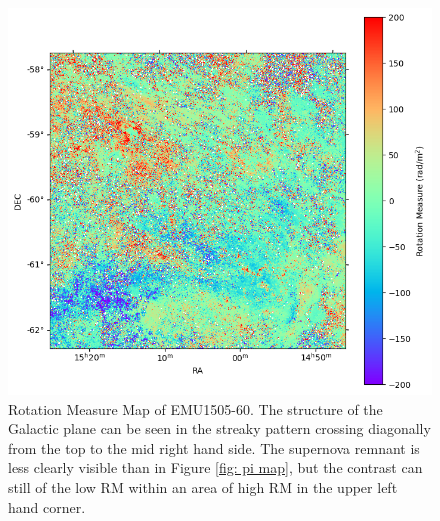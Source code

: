 \begin{figure}
    \centering
    \includegraphics[width=1\linewidth]{Thesis_Template//Figures/RM map.png}
        \caption[Rotation Measure Map of EMU1505-60]{Rotation Measure Map of EMU1505-60. The structure of the Galactic plane can be seen in the streaky pattern crossing diagonally from the top to the mid right hand side. The supernova remnant is less clearly visible than in Figure \ref{fig: pi map}, but the contrast can still of the low RM within an area of high RM in the upper left hand corner.}
    \label{fig: rm map}
\end{figure}

